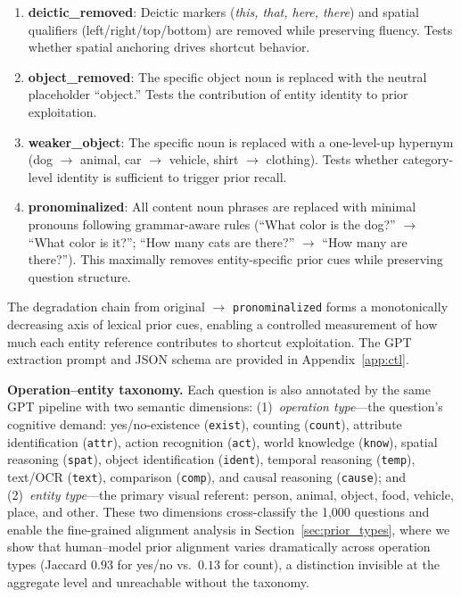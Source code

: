 \documentclass[letterpaper]{article}
\begin{document}
\begin{enumerate}
    \item \textbf{deictic\_removed}: Deictic markers (\textit{this, that, here,
    there}) and spatial qualifiers (left/right/top/bottom) are removed while
    preserving fluency. Tests whether spatial anchoring drives shortcut behavior.

    \item \textbf{object\_removed}: The specific object noun is replaced with the
    neutral placeholder ``object.'' Tests the contribution of entity identity to
    prior exploitation.

    \item \textbf{weaker\_object}: The specific noun is replaced with a
    one-level-up hypernym (dog $\to$ animal, car $\to$ vehicle, shirt $\to$
    clothing). Tests whether category-level identity is sufficient to trigger
    prior recall.

    \item \textbf{pronominalized}: All content noun phrases are replaced with
    minimal pronouns following grammar-aware rules (``What color is the dog?''
    $\to$ ``What color is it?''; ``How many cats are there?'' $\to$ ``How many
    are there?''). This maximally removes entity-specific prior cues while
    preserving question structure.
\end{enumerate}

The degradation chain from original $\to$ \texttt{pronominalized} forms a
monotonically decreasing axis of lexical prior cues, enabling a controlled
measurement of how much each entity reference contributes to shortcut
exploitation. The GPT extraction prompt and JSON schema are provided in
Appendix~\ref{app:ctl}.

\textbf{Operation--entity taxonomy.}
Each question is also annotated by the same GPT pipeline with two semantic
dimensions: (1)~\emph{operation type}---the question's cognitive demand:
yes/no-existence (\texttt{exist}), counting (\texttt{count}), attribute
identification (\texttt{attr}), action recognition (\texttt{act}), world
knowledge (\texttt{know}), spatial reasoning (\texttt{spat}), object
identification (\texttt{ident}), temporal reasoning (\texttt{temp}),
text/OCR (\texttt{text}), comparison (\texttt{comp}), and causal reasoning
(\texttt{cause}); and (2)~\emph{entity type}---the primary visual referent:
person, animal, object, food, vehicle, place, and other.
These two dimensions cross-classify the 1{,}000 questions and enable the
fine-grained alignment analysis in Section~\ref{sec:prior_types}, where we show
that human--model prior alignment varies dramatically across operation types
(Jaccard $0.93$ for yes/no vs.\ $0.13$ for count), a distinction invisible at
the aggregate level and unreachable without the taxonomy.
\end{document}
